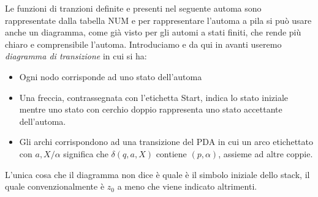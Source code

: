 \documentclass[a4paper]{book}
\theoremstyle{definition}%
\begin{document}
  Le funzioni di tranzioni definite e presenti nel seguente automa sono rappresentate dalla tabella NUM e per rappresentare l'automa a pila
  si può usare anche un diagramma, come già visto per gli automi a stati finiti, che rende più chiaro e comprensibile l'automa.\newline
  Introduciamo e da qui in avanti useremo \emph{diagramma di transizione} in cui si ha:
  \begin{itemize}
  \item Ogni nodo corrisponde ad uno stato dell'automa
  \item Una freccia, contrassegnata con l'etichetta Start, indica lo stato iniziale mentre uno stato con cerchio doppio
    rappresenta uno stato accettante dell'automa.
  \item Gli archi corrispondono ad una transizione del PDA in cui un arco etichettato con $a,X / \alpha$ significa che
    $\delta(q,a,X)$ contiene $(p,\alpha)$, assieme ad altre coppie.
  \end{itemize}
  L'unica cosa che il diagramma non dice è quale è il simbolo iniziale dello stack, il quale convenzionalmente è $z_0$
  a meno che viene indicato altrimenti.
\end{document}
